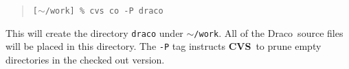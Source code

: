 \documentclass[11pt]{nmemo}
\newcommand{\comp}[1]{\normalfont\footnotesize\texttt{#1}\normalsize}
\newcommand{\draco}{{\normalfont\sffamily Draco}}
\newcommand{\tycho}{{\normalfont\sffamily Tycho}}
\newcommand{\metis}{{\normalfont\sffamily Metis}}
\newcommand{\cvs}{{\normalfont\bfseries CVS}}
\begin{document}
\footnotesize
\begin{verse}
\texttt{[$\sim$/work] \% cvs co -P draco} \\
\end{verse}
\normalsize

This will create the directory \comp{draco} under \comp{$\sim$/work}.  All
of the \draco\ source files will be placed in this directory.  The
\comp{-P} tag instructs \cvs\ to prune empty directories in the
checked out version.  

%

%
%
%
%
%
%
\end{document}
